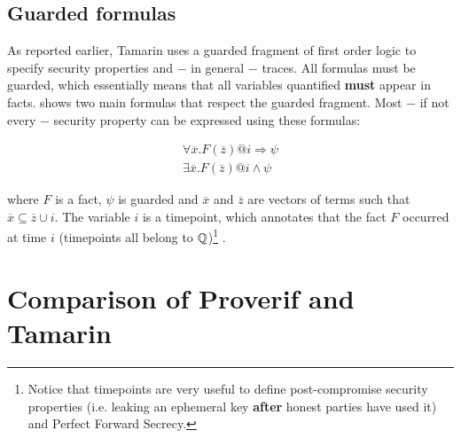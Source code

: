 \subsection{Guarded formulas}
\label{sub:guarded-formulas}

As reported earlier, Tamarin uses a guarded fragment of first order logic to specify security properties and $-$ in general $-$ traces. All formulas must be guarded, which essentially means that all variables quantified \textbf{must} appear in facts.  shows two main formulas that respect the guarded fragment. Most $-$ if not every $-$ security property can be expressed using these formulas:

\begin{equation}
\label{eq:guarded-formulas}
\begin{gathered}
    \forall \overline{x}. F\left(\overline{z}\right) @i \Rightarrow \psi \\
    \exists \overline{x}. F\left(\overline{z}\right) @i \land \psi
\end{gathered}
\end{equation}

where $F$ is a fact, $\psi$ is guarded and $\overline{x}$ and $\overline{z}$ are vectors of terms such that $\overline{x} \subseteq \overline{z} \cup i$.
The variable $i$ is a timepoint, which annotates that the fact $F$ occurred at time $i$ (timepoints all belong to $\mathbb{Q}$)\footnote{Notice that timepoints are very useful to define post-compromise security properties (i.e. leaking an ephemeral key \textbf{after} honest parties have used it) and Perfect Forward Secrecy.} \cite{TamarinTeachingSlides}.

\section{Comparison of Proverif and Tamarin}
\label{section:proverif-vs-tamarin}

